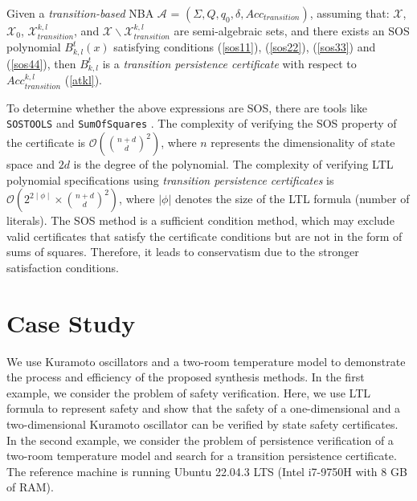 \documentclass[acmlarge]{acmart}
\begin{document}
\begin{lemma}
  Given a \emph{transition-based} NBA $\mathcal{A}$ = $(\Sigma, Q, q_0, \delta, Acc_{transition})$, assuming that: $ \mathcal{X}$, $ \mathcal{X}_{0}$, $\mathcal{X}_{transition}^{k,l}$, and $\mathcal{X} \backslash \mathcal{X}_{transition}^{k,l}$ are semi-algebraic sets, and there exists an SOS polynomial $B^t_{k, l}(x)$ satisfying conditions (\ref{sos11}), (\ref{sos22}), (\ref{sos33}) and (\ref{sos44}), then $B^t_{k, l}$ is a \textit{transition persistence certificate} with respect to $Acc_{transition}^{k, l}$ (\ref{atkl}).
\end{lemma}

To determine whether the above expressions are SOS, there are tools like \texttt{SOSTOOLS} \cite{prajna2002introducing} and \texttt{SumOfSquares} \cite{Yuan_SumOfSquares_py}. The complexity of verifying the SOS property of the certificate is $\mathcal{O}\left( \binom{n+d}{d}^2 \right) $\cite{parrilo2003semidefinite}, where $ n $ represents the dimensionality of state space  and $ 2d $ is the degree of the polynomial. The complexity of verifying LTL polynomial specifications using \emph{transition persistence certificates} is $\mathcal{O}\left( 2^{2 \mid \phi \mid } \times \binom{n+d}{d}^2 \right)$, where $|\phi|$ denotes the size of the LTL formula (number of literals). The SOS method is a sufficient condition method, which may exclude valid certificates that satisfy the certificate conditions but are not in the form of sums of squares. Therefore, it leads to conservatism due to the stronger satisfaction conditions.


\section{Case Study}
We use Kuramoto oscillators \cite{guo2021overviews} and a two-room temperature model \cite{anand2024compositional} to demonstrate the process and efficiency of the proposed synthesis methods.
In the first example, we consider the problem of safety verification. Here, we use LTL formula to represent safety and show that the safety of a one-dimensional and a two-dimensional Kuramoto oscillator can be verified by state safety certificates. In the second example, we consider the problem of persistence verification of a two-room temperature model and search for a transition persistence certificate. The reference machine is running Ubuntu 22.04.3 LTS (Intel i7-9750H with 8 GB of RAM).
\end{document}
